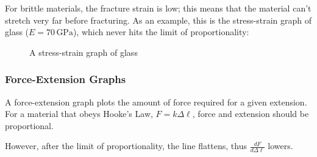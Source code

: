                 For brittle materials, the fracture strain is low; this means that the material can't stretch very far before fracturing.
                As an example, this is the stress-strain graph of glass ($E=70\,\text{GPa}$), which never hits the limit of proportionality:
                \begin{figure}
                    \centering
                    \caption{A stress-strain graph of glass}
                \end{figure}

            \subsubsection{Force-Extension Graphs}
                A force-extension graph plots the amount of force required for a given extension.
                For a material that obeys Hooke's Law, $F=k\Delta\ell$, force and extension should be proportional.


                However, after the limit of proportionality, the line flattens, thus $\frac{dF}{d\Delta\ell}$ lowers.

    \newpage